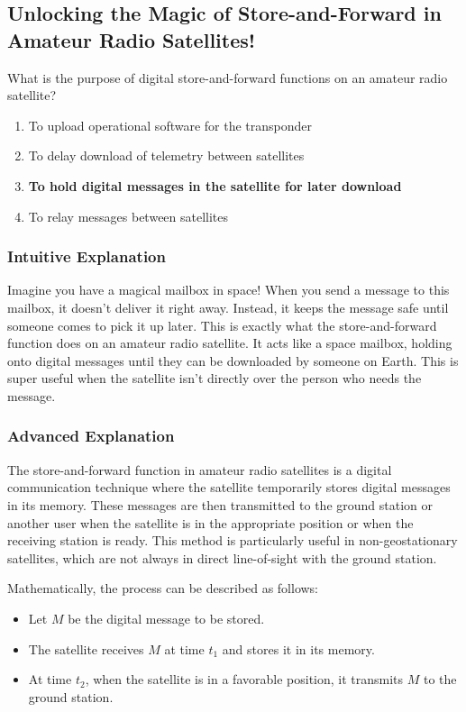 \subsection{Unlocking the Magic of Store-and-Forward in Amateur Radio Satellites!}

\begin{tcolorbox}[colback=gray!10!white,colframe=black!75!black,title=E2A12] What is the purpose of digital store-and-forward functions on an amateur radio satellite?
    \begin{enumerate}[label=\Alph*.]
        \item To upload operational software for the transponder
        \item To delay download of telemetry between satellites
        \item \textbf{To hold digital messages in the satellite for later download}
        \item To relay messages between satellites
    \end{enumerate}
\end{tcolorbox}

\subsubsection{Intuitive Explanation}
Imagine you have a magical mailbox in space! When you send a message to this mailbox, it doesn’t deliver it right away. Instead, it keeps the message safe until someone comes to pick it up later. This is exactly what the store-and-forward function does on an amateur radio satellite. It acts like a space mailbox, holding onto digital messages until they can be downloaded by someone on Earth. This is super useful when the satellite isn’t directly over the person who needs the message.

\subsubsection{Advanced Explanation}
The store-and-forward function in amateur radio satellites is a digital communication technique where the satellite temporarily stores digital messages in its memory. These messages are then transmitted to the ground station or another user when the satellite is in the appropriate position or when the receiving station is ready. This method is particularly useful in non-geostationary satellites, which are not always in direct line-of-sight with the ground station.

Mathematically, the process can be described as follows:
\begin{itemize}
    \item Let \( M \) be the digital message to be stored.
    \item The satellite receives \( M \) at time \( t_1 \) and stores it in its memory.
    \item At time \( t_2 \), when the satellite is in a favorable position, it transmits \( M \) to the ground station.
\end{itemize}

